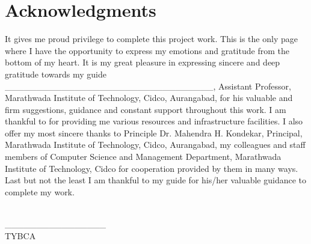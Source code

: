 \hspace{5cm} \chapter*{Acknowledgments}
\vspace{1.0in}
It gives me proud privilege to complete this project work. This is the only page where I have the opportunity to express my emotions and gratitude from the bottom of my heart.
It is my great pleasure in expressing sincere and deep gratitude towards my guide  \_\_\_\_\_\_\_\_\_\_\_\_\_\_\_\_\_\_\_\_\_\_\_\_\_\_\_\_\_\_\_\_\_, Assistant Professor, Marathwada Institute of Technology, Cidco, Aurangabad, for his valuable and firm suggestions, guidance and constant support throughout this work. I am thankful to for providing me various resources and infrastructure facilities.
I also offer my most sincere thanks to Principle Dr. Mahendra H. Kondekar, Principal, Marathwada Institute of Technology, Cidco, Aurangabad, my colleagues and staff members of Computer Science and Management Department, Marathwada Institute of Technology, Cidco for cooperation provided by them in many ways.
Last but not the least I am thankful to my guide 	for his/her
valuable guidance to complete my work.

\begin{flushright}
	\\
	\_\_\_\_\_\_\_\_\_\_\_\_\_\_\_\_ \\TYBCA \hspace{2.5cm}
\end{flushright}


